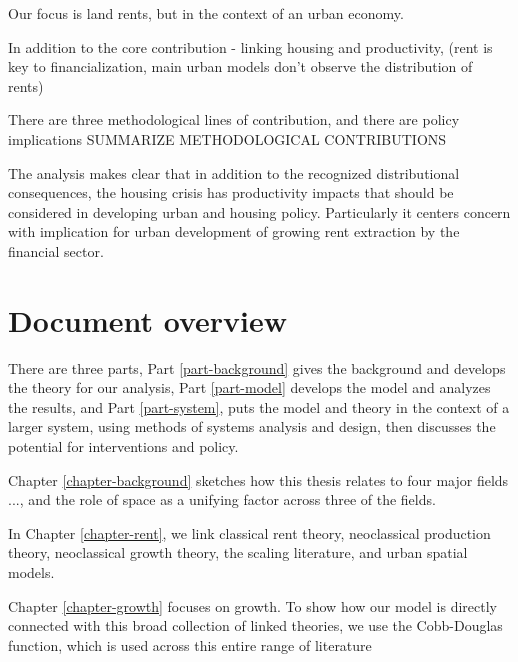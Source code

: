 Our focus is land rents, but in the context of an urban economy. 


In addition to the core contribution - linking housing and productivity, 
(rent is key to financialization, main urban models don't observe the distribution of rents)

There are three methodological lines of contribution, and there are policy implications SUMMARIZE METHODOLOGICAL CONTRIBUTIONS

The analysis makes clear that in addition to the recognized distributional consequences, the housing crisis has productivity impacts that should be considered in developing urban and housing policy. Particularly it centers concern with implication for urban development of growing rent extraction by the financial sector. 


\section{Document overview}
There are three parts, Part \ref{part-background} gives the background and develops the %
theory for our analysis, Part \ref{part-model} develops the model and analyzes the results, and Part \ref{part-system}, puts the model and theory in the context of a larger system, using methods of systems analysis and design, then discusses the potential for interventions and policy.

Chapter \ref{chapter-background} sketches how this thesis relates to four major fields ..., and the role of space as a unifying factor across three of the fields.

In Chapter \ref{chapter-rent}, we link classical rent theory, neoclassical production theory, neoclassical growth theory, the scaling literature, and urban spatial models.

Chapter \ref{chapter-growth} focuses on growth. To show how our model is directly connected with this broad collection of linked theories, we use the Cobb-Douglas function, which is used across this entire range of literature 

